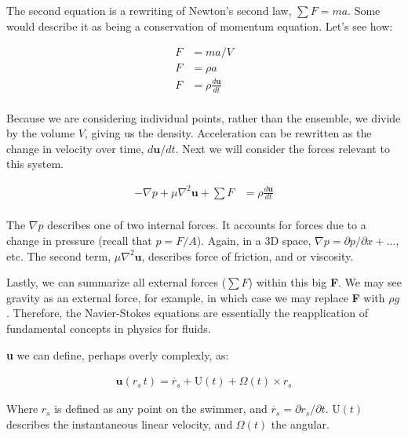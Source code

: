 The second equation is a rewriting of Newton's second law, $\sum F = ma$. Some would describe it as being a conservation of momentum equation. Let's see how: 

\begin{equation} \label{NSderive1}
\begin{split}
F & = ma / V \\
F & = \rho a \\
F & = \rho \frac{d\mathbf{u}}{dt} \\
\end{split}
\end{equation}

Because we are considering individual points, rather than the ensemble, we divide by the volume $V$, giving us the density. Acceleration can be rewritten as the change in velocity over time, $d\mathbf{u} / dt$. Next we will consider the forces relevant to this system. 

\begin{equation} \label{NSderive2}
\begin{split}
-\nabla p + \mu \nabla^2\mathbf{u} + \sum F & = \rho \frac{d\mathbf{u}}{dt} \\
\end{split}
\end{equation}

The $\nabla p$ describes one of two internal forces. It accounts for forces due to a change in pressure (recall that $p = F/A$). Again, in a 3D space, $\nabla p = \partial p / \partial x + ... $, etc. The second term, $\mu \nabla^2\mathbf{u}$, describes force of friction, and or viscosity.\newline

Lastly, we can summarize all external forces ($\sum F$) within this big \textbf{F}. We may see gravity as an external force, for example, in which case we may replace \textbf{F} with $\rho g$. Therefore, the Navier-Stokes equations are essentially the reapplication of fundamental concepts in physics for fluids.\newline

\textbf{u} we can define, perhaps overly complexly, as:

\begin{equation} \label{NS3}
\begin{split}
\mathbf{u}(r_s\,t) = \dot{r_s} + \mathrm{U}(t) + \Omega(t)\times r_s
\end{split}
\end{equation}

Where $r_s$ is defined as any point on the swimmer, and $\dot{r_s} = \partial r_s / \partial t$. $\mathrm{U}(t)$ describes the instantaneous linear velocity, and $\Omega(t)$ the angular.\newline

